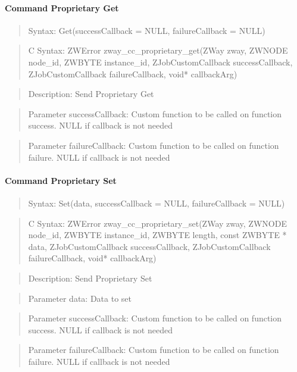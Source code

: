 \paragraph{Command Proprietary Get}
\begin{quote}Syntax: Get(successCallback = NULL, failureCallback = NULL)\end{quote}
\begin{quote}C Syntax: ZWError zway\_cc\_proprietary\_get(ZWay zway, ZWNODE node\_id, ZWBYTE instance\_id, ZJobCustomCallback successCallback, ZJobCustomCallback failureCallback, void* callbackArg)\end{quote}
\begin{quote}Description: Send Proprietary Get\end{quote}
\begin{quote}Parameter successCallback: Custom function to be called on function success. NULL if callback is not needed\end{quote}
\begin{quote}Parameter failureCallback: Custom function to be called on function failure. NULL if callback is not needed\end{quote}


\paragraph{Command Proprietary Set}
\begin{quote}Syntax: Set(data, successCallback = NULL, failureCallback = NULL)\end{quote}
\begin{quote}C Syntax: ZWError zway\_cc\_proprietary\_set(ZWay zway, ZWNODE node\_id, ZWBYTE instance\_id, ZWBYTE length, const ZWBYTE * data, ZJobCustomCallback successCallback, ZJobCustomCallback failureCallback, void* callbackArg)\end{quote}
\begin{quote}Description: Send Proprietary Set\end{quote}
\begin{quote}Parameter data: Data to set\end{quote}
\begin{quote}Parameter successCallback: Custom function to be called on function success. NULL if callback is not needed\end{quote}
\begin{quote}Parameter failureCallback: Custom function to be called on function failure. NULL if callback is not needed\end{quote}



